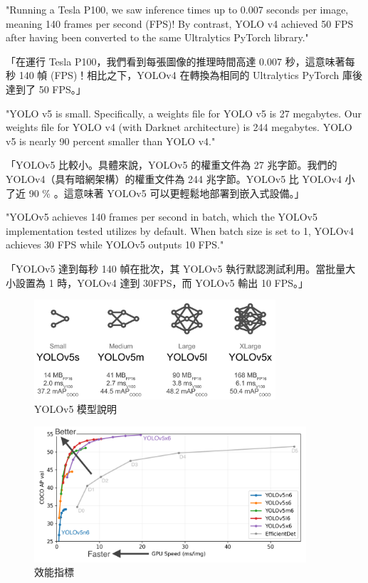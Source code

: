 \documentclass[10pt,UTF8]{ctexart}
\begin{document}
"Running a Tesla P100, we saw inference times up to 0.007 seconds per image, meaning 140 frames per second (FPS)! By contrast, YOLO v4 achieved 50 FPS after having been converted to the same Ultralytics PyTorch library."

「在運行 Tesla P100，我們看到每張圖像的推理時間高達 0.007 秒，這意味著每秒 140 幀 (FPS)！相比之下，YOLOv4 在轉換為相同的 Ultralytics PyTorch 庫後達到了 50 FPS。」

"YOLO v5 is small. Specifically, a weights file for YOLO v5 is 27 megabytes. Our weights file for YOLO v4 (with Darknet architecture) is 244 megabytes. YOLO v5 is nearly 90 percent smaller than YOLO v4."

「YOLOv5 比較小。具體來說，YOLOv5 的權重文件為 27 兆字節。我們的 YOLOv4（具有暗網架構）的權重文件為 244 兆字節。YOLOv5 比 YOLOv4 小了近 90 \% 。這意味著 YOLOv5 可以更輕鬆地部署到嵌入式設備。」

"YOLOv5 achieves 140 frames per second in batch, which the YOLOv5 implementation tested utilizes by default. When batch size is set to 1, YOLOv4 achieves 30 FPS while YOLOv5 outputs 10 FPS."

「YOLOv5 達到每秒 140 幀在批次，其 YOLOv5 執行默認測試利用。當批量大小設置為 1 時，YOLOv4 達到 30FPS，而 YOLOv5 輸出 10 FPS。」


\begin{figure}[H]
\centering 
\includegraphics[width=0.80\textwidth]{d1.png} 
\caption{YOLOv5 模型說明}
\label{Test}
\end{figure}

\begin{figure}[H]
\centering 
\includegraphics[width=0.90\textwidth]{d2.png} 
\caption{效能指標}
\label{Test}
\end{figure}
\end{document}
